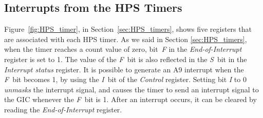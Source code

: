 \subsection{Interrupts from the HPS Timers}

Figure~\ref{fig:HPS_timer}, in Section~\ref{sec:HPS_timers}, shows five registers that
are associated with each HPS timer. As we said in Section \ref{sec:HPS_timers}, 
when the timer reaches a count value of zero, bit~{\it F} in the {\it End-of-Interrupt} register 
is set to 1. The value of the {\it F}~bit is also reflected in the {\it S}~bit in the 
{\it Interrupt status} register.  It is possible to generate an A9 interrupt when the 
{\it F}~bit becomes 1, by using the {\it I}~bit of the {\it Control} register.  
Setting bit {\it I} to 0 {\it unmasks} the interrupt signal, and causes the timer to send an
interrupt signal to the GIC whenever the {\it F}~bit is 1.  After an interrupt occurs, it can 
be cleared by reading the {\it End-of-Interrupt} register.


